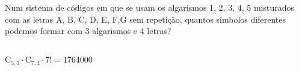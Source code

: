 \begin{ex}
 Num sistema de códigos em que se usam os algarismos 1, 2, 3, 4, 5 misturados com as letras A, B, C, D, E, F,G sem repetição, quantos símbolos diferentes podemos formar com 3 algarismos e 4 letras?
 \begin{sol}
     \phantom{A} \\
 $\mathrm{C}_{5,3}\cdot \mathrm{C}_{7,4}\cdot 7!= 1764000$
 \end{sol}
\end{ex}